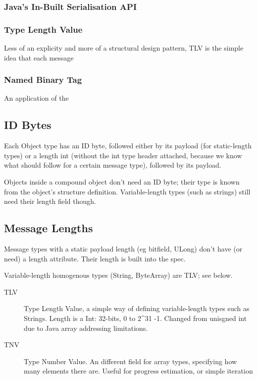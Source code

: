 \documentclass[12pt,a4paper,]{book}
\begin{document}
\subsubsection{Java's In-Built Serialisation
API}\label{javas-in-built-serialisation-api}

\subsubsection{Type Length Value}\label{type-length-value}

Less of an explicity and more of a structural design pattern, TLV is the
simple idea that each message

\subsubsection{Named Binary Tag}\label{named-binary-tag}

An application of the

\subsection{ID Bytes}\label{id-bytes}

Each Object type has an ID byte, followed either by its payload (for
static-length types) or a length int (without the int type header
attached, because we know what should follow for a certain message
type), followed by its payload.

Objects inside a compound object don't need an ID byte; their type is
known from the object's structure definition. Variable-length types
(such as strings) still need their length field though.

\subsection{Message Lengths}\label{message-lengths}

Message types with a static payload length (eg bitfield, ULong) don't
have (or need) a length attribute. Their length is built into the spec.

Variable-length homogenous types (String, ByteArray) are TLV; see below.

\begin{description}
\item[TLV]
Type Length Value, a simple way of defining variable-length types such
as Strings. Length is a Int: 32-bits, 0 to 2\^{}31 -1. Changed from
unisgned int due to Java array addressing limitations.
\item[TNV]
Type Number Value. An different field for array types, specifying how
many elements there are. Useful for progress estimation, or simple
iteration
\end{description}
\end{document}

